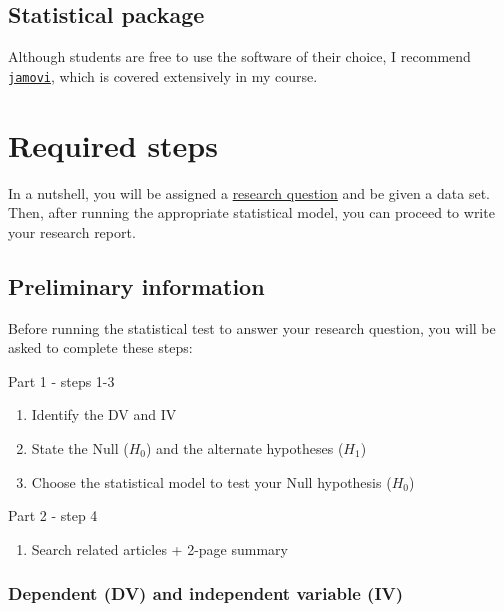 \documentclass[
]{article}
\providecommand{\tightlist}{%
  \setlength{\itemsep}{0pt}\setlength{\parskip}{0pt}}
\begin{document}
\hypertarget{statistical-package}{%
\subsection{Statistical package}\label{statistical-package}}

Although students are free to use the software of their choice, I recommend \href{www.jamovi.org}{\texttt{jamovi}}, which is covered extensively in my course.

\hypertarget{steps}{%
\section{Required steps}\label{steps}}

In a nutshell, you will be assigned a \protect\hyperlink{appendix-a}{research question} and be given a data set. Then, after running the appropriate statistical model, you can proceed to write your research report.

\hypertarget{prelim-info}{%
\subsection{Preliminary information}\label{prelim-info}}

Before running the statistical test to answer your research question, you will be asked to complete these steps:

Part 1 - steps 1-3

\begin{enumerate}
\def\labelenumi{\arabic{enumi}.}
\tightlist
\item
  Identify the DV and IV
\item
  State the Null (\(H_0\)) and the alternate hypotheses (\(H_1\))
\item
  Choose the statistical model to test your Null hypothesis (\(H_0\))
\end{enumerate}

Part 2 - step 4

\begin{enumerate}
\def\labelenumi{\arabic{enumi}.}
\setcounter{enumi}{3}
\tightlist
\item
  Search related articles + 2-page summary
\end{enumerate}

\hypertarget{dependent-dv-and-independent-variable-iv}{%
\subsubsection{Dependent (DV) and independent variable (IV)}\label{dependent-dv-and-independent-variable-iv}}
\end{document}
